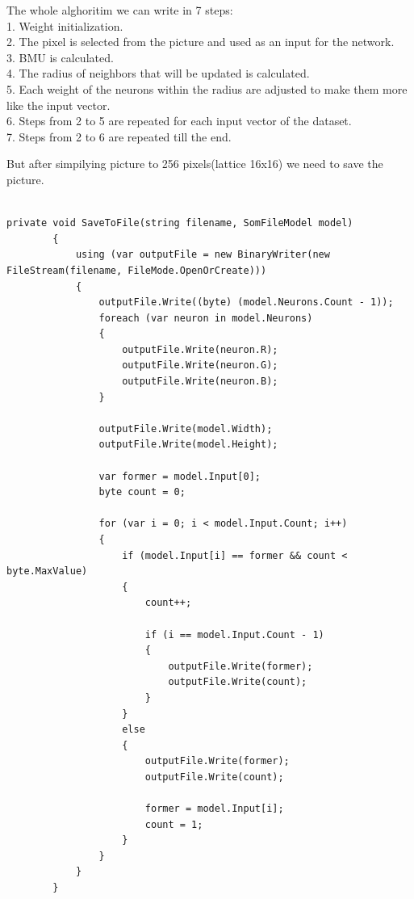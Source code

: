 \documentclass[12pt,a4paper]{article}
\begin{document}
The whole alghoritim we can write in 7 steps:\\
1. Weight initialization.\\
2. The pixel is selected from the picture and used as an input for the network.\\
3. BMU is calculated.\\
4. The radius of neighbors that will be updated is calculated.\\
5. Each weight of the neurons within the radius are adjusted to make them more like the input vector.\\
6. Steps from 2 to 5 are repeated for each input vector of the dataset.\\
7. Steps from 2 to 6 are repeated till the end.

But after simpilying picture to 256 pixels(lattice 16x16) we need to save the picture. 

\begin{lstlisting}

private void SaveToFile(string filename, SomFileModel model)
        {
            using (var outputFile = new BinaryWriter(new FileStream(filename, FileMode.OpenOrCreate)))
            {
                outputFile.Write((byte) (model.Neurons.Count - 1));
                foreach (var neuron in model.Neurons)
                {
                    outputFile.Write(neuron.R);
                    outputFile.Write(neuron.G);
                    outputFile.Write(neuron.B);
                }

                outputFile.Write(model.Width);
                outputFile.Write(model.Height);

                var former = model.Input[0];
                byte count = 0;

                for (var i = 0; i < model.Input.Count; i++)
                {
                    if (model.Input[i] == former && count < byte.MaxValue)
                    {
                        count++;

                        if (i == model.Input.Count - 1)
                        {
                            outputFile.Write(former);
                            outputFile.Write(count);
                        }
                    }
                    else
                    {
                        outputFile.Write(former);
                        outputFile.Write(count);

                        former = model.Input[i];
                        count = 1;
                    }
                }
            }
        }
\end{lstlisting}
\end{document}
